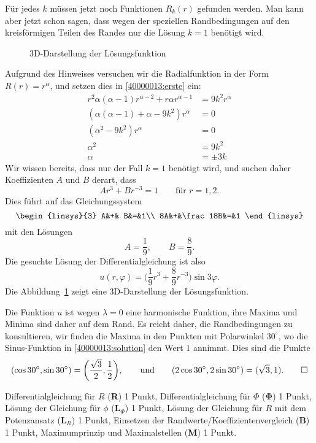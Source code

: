 \begin{loesung}
\begin{teilaufgaben}
Für jedes $k$ müssen jetzt noch Funktionen $R_k(r)$ gefunden werden.
Man kann aber jetzt schon sagen, dass wegen der speziellen Randbedingungen
auf den kreisförmigen Teilen des Randes nur die Lösung $k=1$ benötigt wird.

\begin{figure}
\centering
{}
\caption{3D-Darstellung der Lösungsfunktion
\label{40000013:3d}}
\end{figure}
Aufgrund des Hinweises versuchen wir die Radialfunktion in der Form
$R(r)=r^\alpha$, und setzen dies in \eqref{40000013:erste} ein:
\begin{align*}
r^2\alpha(\alpha-1)r^{\alpha-2}+r\alpha r^{\alpha-1}&=9k^2r^{\alpha}
\\
(\alpha(\alpha-1)+\alpha -9k^2)r^{\alpha}&=0
\\
(\alpha^2 -9k^2)r^{\alpha}&=0
\\
\alpha^2&=9k^2
\\
\alpha&=\pm3k
\end{align*}
Wir wissen bereits, dass nur der Fall $k=1$ benötigt wird, und suchen
daher Koeffizienten $A$ und $B$ derart, dass
\[
Ar^3+Br^{-3}=1\qquad \text{für $r=1,2$.}
\]
Dies führt auf das Gleichungssystem
\[
\begin{linsys}{3}
 A&+&       B&=&1\\
8A&+&\frac18B&=&1
\end{linsys}
\]
mit den Lösungen
\[
A=\frac19,\qquad B=\frac89.
\]
Die gesuchte Lösung der Differentialgleichung ist also
\begin{equation}
u(r,\varphi)=\biggl(\frac19r^3+\frac89r^{-3}\biggr)\sin 3\varphi.
\label{40000013:solution}
\end{equation}
Die Abbildung~\ref{40000013:3d} zeigt eine 3D-Darstellung der Lösungsfunktion.
\item
Die Funktion $u$ ist wegen $\lambda=0$ eine harmonische Funktion, ihre
Maxima und Minima sind daher auf dem Rand.
Es reicht daher, die Randbedingungen zu konsultieren, wir finden die
Maxima in den Punkten mit Polarwinkel $30^\circ$, wo die Sinus-Funktion
in \eqref{40000013:solution} den Wert $1$ annimmt.
Dies sind die Punkte
\[
(\cos 30^\circ, \sin 30^\circ)=\biggl(
\frac{\sqrt{3}}{2}
,
\frac12
\biggr),\qquad
\text{und}\qquad
(
2\cos 30^\circ
,
2\sin 30^\circ
)=(
\sqrt{3}
,
1
).
\qedhere
\]
\end{teilaufgaben}
\end{loesung}

\begin{bewertung}
Differentialgleichung für $R$ ({\bf R}) 1 Punkt,
Differentialgleichung für $\Phi$ ({$\mathbf \Phi$}) 1 Punkt,
Lösung der Gleichung für $\phi$ ($\textbf{L}_\Phi$) 1 Punkt,
Lösung der Gleichung für $R$ mit dem Potenzansatz ($\textbf{L}_R$) 1 Punkt,
Einsetzen der Randwerte/Koeffizientenvergleich ({\bf B}) 1 Punkt,
Maximumprinzip und Maximalstellen ({\bf M}) 1 Punkt.
\end{bewertung}


